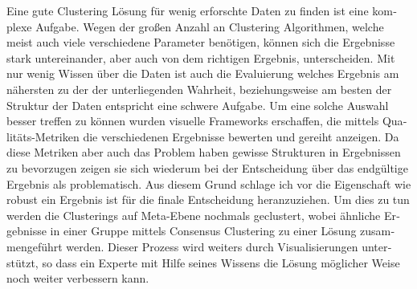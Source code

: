 \iffalse  \fi

\begin{otherlanguage}{ngerman}

Eine gute Clustering Lösung für wenig erforschte Daten zu finden ist eine komplexe Aufgabe. Wegen der großen Anzahl an Clustering Algorithmen, welche meist auch viele verschiedene Parameter benötigen, können sich die Ergebnisse stark untereinander, aber auch von dem richtigen Ergebnis, unterscheiden. Mit nur wenig Wissen über die Daten ist auch die Evaluierung welches Ergebnis am nähersten zu der der unterliegenden Wahrheit, beziehungsweise am besten der Struktur der Daten entspricht eine schwere Aufgabe.  Um eine solche Auswahl besser treffen zu können wurden visuelle Frameworks erschaffen, die mittels Qualitäts-Metriken die verschiedenen Ergebnisse bewerten und gereiht anzeigen. Da diese Metriken aber auch das Problem haben gewisse Strukturen in Ergebnissen zu bevorzugen zeigen sie sich wiederum bei der Entscheidung über das endgültige Ergebnis als problematisch. Aus diesem Grund schlage ich vor die Eigenschaft wie robust ein Ergebnis ist für die finale Entscheidung heranzuziehen. Um dies zu tun werden die Clusterings auf Meta-Ebene nochmals geclustert, wobei ähnliche Ergebnisse in einer Gruppe mittels Consensus Clustering zu einer Lösung zusammengeführt werden. Dieser Prozess wird weiters durch Visualisierungen unterstützt, so dass ein Experte mit Hilfe seines Wissens die Lösung möglicher Weise noch weiter verbessern kann.

\end{otherlanguage}
